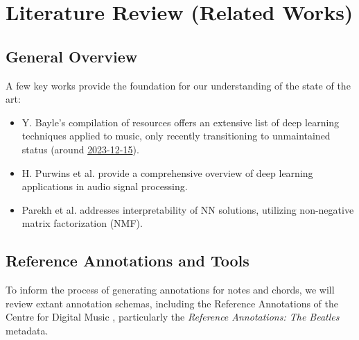 
\section{Literature Review (Related Works)}

\subsection{General Overview}
A few key works provide the foundation for our understanding of the state of the art:
\begin{itemize}
    \item Y. Bayle's compilation of resources \cite{Bayle2018} offers an extensive list of deep learning techniques applied to music, only recently transitioning to unmaintained status (around \href{https://github.com/ybayle/awesome-deep-learning-music/commit/b252aaf8d441173d4b23bcdd184f2d2fcd61d7cb#diff-b335630551682c19a781afebcf4d07bf978fb1f8ac04c6bf87428ed5106870f5R1}{2023-12-15}).
    \item H. Purwins et al. \cite{Purwins2019} provide a comprehensive overview of deep learning applications in audio signal processing.
    \item Parekh et al. \cite{parekh2022listen} addresses interpretability of NN solutions, utilizing non-negative matrix factorization (NMF).
\end{itemize}

\subsection{Reference Annotations and Tools}
To inform the process of generating annotations for notes and chords, we will review extant annotation schemas, including the Reference Annotations of the Centre for Digital Music \cite{IsophonicsReferenceAnnotations}, particularly the \textit{Reference Annotations: The Beatles} \cite{ReferenceAnnotationsBeatles} metadata.


